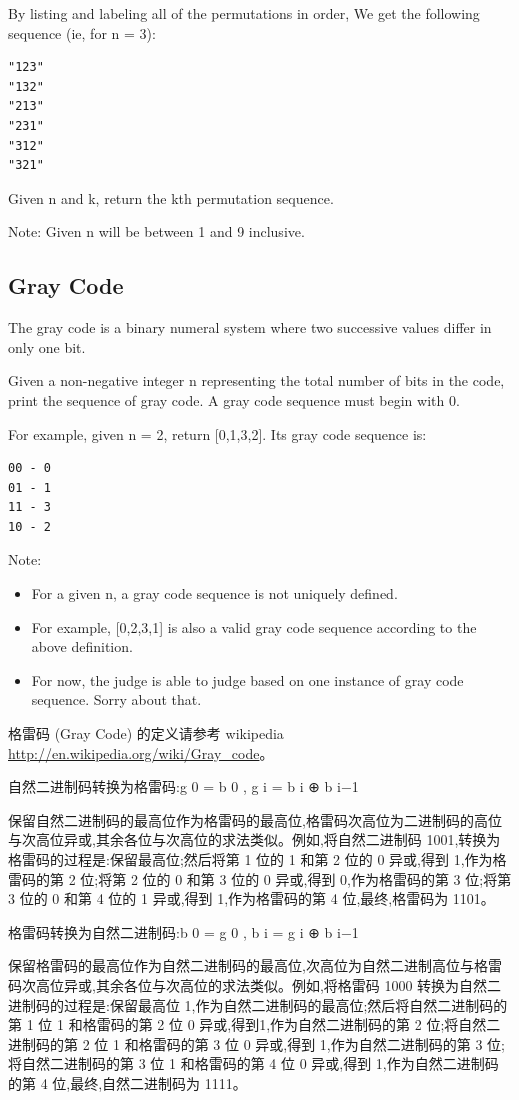 \documentclass[12pt]{book}
\begin{document}
By listing and labeling all of the permutations in order, We get the following sequence (ie, for n = 3):
\lstset{language=java,label= ,caption= ,numbers=none}
\begin{lstlisting}
"123"
"132"
"213"
"231"
"312"
"321"
\end{lstlisting}
Given n and k, return the kth permutation sequence.

Note: Given n will be between 1 and 9 inclusive.
\subsection{Gray Code}
\label{sec-16-1-2}
The gray code is a binary numeral system where two successive values differ in only one bit.

Given a non-negative integer n representing the total number of bits in the code, print the sequence of gray code. A gray code sequence must begin with 0.

For example, given n = 2, return [0,1,3,2]. Its gray code sequence is:
\lstset{language=java,label= ,caption= ,numbers=none}
\begin{lstlisting}
00 - 0
01 - 1
11 - 3
10 - 2
\end{lstlisting}
Note:
\begin{itemize}
\item For a given n, a gray code sequence is not uniquely defined.
\item For example, [0,2,3,1] is also a valid gray code sequence according to the above definition.
\item For now, the judge is able to judge based on one instance of gray code sequence. Sorry about that.
\end{itemize}

格雷码 (Gray Code) 的定义请参考 wikipedia \url{http://en.wikipedia.org/wiki/Gray_code}。

自然二进制码转换为格雷码:g 0 = b 0 , g i = b i ⊕ b i−1

保留自然二进制码的最高位作为格雷码的最高位,格雷码次高位为二进制码的高位与次高位异或,其余各位与次高位的求法类似。例如,将自然二进制码 1001,转换为格雷码的过程是:保留最高位;然后将第 1 位的 1 和第 2 位的 0 异或,得到 1,作为格雷码的第 2 位;将第 2 位的 0 和第 3 位的 0 异或,得到 0,作为格雷码的第 3 位;将第 3 位的 0 和第 4 位的 1 异或,得到 1,作为格雷码的第 4 位,最终,格雷码为 1101。

格雷码转换为自然二进制码:b 0 = g 0 , b i = g i ⊕ b i−1

保留格雷码的最高位作为自然二进制码的最高位,次高位为自然二进制高位与格雷码次高位异或,其余各位与次高位的求法类似。例如,将格雷码 1000 转换为自然二进制码的过程是:保留最高位 1,作为自然二进制码的最高位;然后将自然二进制码的第 1 位 1 和格雷码的第 2 位 0 异或,得到1,作为自然二进制码的第 2 位;将自然二进制码的第 2 位 1 和格雷码的第 3 位 0 异或,得到 1,作为自然二进制码的第 3 位;将自然二进制码的第 3 位 1 和格雷码的第 4 位 0 异或,得到 1,作为自然二进制码的第 4 位,最终,自然二进制码为 1111。
\end{document}
